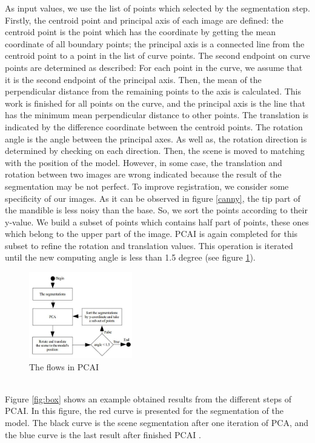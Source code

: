 \documentclass[twoside,twocolumn,10pt]{article}
\begin{document}
As input values, we use the list of points which selected by the segmentation step. Firstly, the centroid point and principal axis of each image are defined: the centroid point is the point which has the coordinate by getting the mean coordinate of all boundary points; the principal axis is a connected line from the centroid point to a point in the list of curve points. The second endpoint on curve points are determined as described: For each point in the curve, we assume that it is the second endpoint of the principal axis. Then, the mean of the perpendicular distance from the remaining points to the axis is calculated. This work is finished for all points on the curve, and the principal axis is the line that has the minimum mean perpendicular distance to other points. The translation is indicated by the difference coordinate between the centroid points. The rotation angle is the angle between the principal axes. As well as, the rotation direction is determined by checking on each direction. Then, the scene is moved to matching with the position of the model. However,
in some case, the translation and rotation between two images are
wrong indicated because the result of the segmentation may be not perfect. To improve registration, we consider some specificity of our images. As it can be observed in figure \ref{canny}, the tip part of the mandible is less noisy than the base. So, we sort the points according to their y-value. We build a subset of points which contains half part of points, these ones which belong to the upper part of the image. PCAI is again completed for this subset to refine the rotation and translation values. This operation is iterated until the new computing angle is less than 1.5 degree (see figure \ref{fig:pcai}).
\begin{figure}[htb]
    \centering
    \includegraphics[width=0.4\textwidth]{./images/pcadiagram}
    \caption{The flows in PCAI}
    \label{fig:pcai}
\end{figure}~\\
Figure \ref{fig:box} shows an example obtained results from the different steps of PCAI. In this figure, the red curve is presented for the segmentation of the model. The black curve is the scene segmentation after one iteration of PCA, and the blue curve is the last result after finished PCAI .\\
\end{document}
